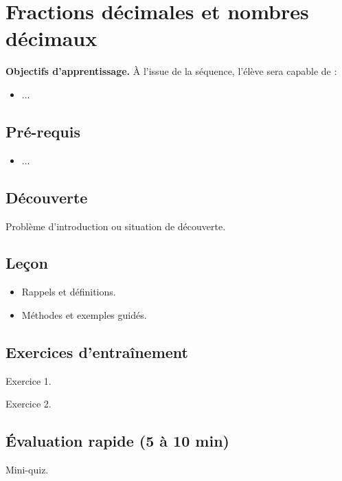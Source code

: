\chapter{Fractions décimales et nombres décimaux}
\label{chap:seq03}

\begin{definitionbox}
\textbf{Objectifs d'apprentissage.} À l'issue de la séquence, l'élève sera capable de :
\begin{itemize}
  \item ...
\end{itemize}
\end{definitionbox}

\section*{Pré-requis}
\begin{itemize}
  \item ...
\end{itemize}

\section{Découverte}
\begin{examplebox}
Problème d'introduction ou situation de découverte.
\end{examplebox}

\section{Leçon}
\begin{itemize}
  \item Rappels et définitions.
  \item Méthodes et exemples guidés.
\end{itemize}

\section{Exercices d'entraînement}
\begin{exercisebox}
Exercice 1.
\end{exercisebox}

\begin{exercisebox}
Exercice 2.
\end{exercisebox}

\section{Évaluation rapide (5 à 10 min)}
\begin{exercisebox}
Mini-quiz.
\end{exercisebox}

